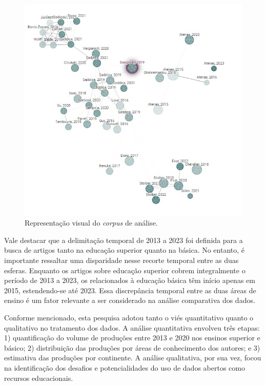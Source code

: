 \documentclass[portuguese]{textolivre}
\begin{document}
\begin{figure}[h]
\centering
\begin{minipage}{0.75\linewidth}
\includegraphics[width=\linewidth]{Fig2.png}
\caption{Representação visual do \textit{corpus} de análise.}
\label{fig2}
\end{minipage}
\end{figure}

Vale destacar que a delimitação temporal de 2013 a 2023 foi definida para a busca de artigos tanto na educação superior quanto na básica. No entanto, é importante ressaltar uma disparidade nesse recorte temporal entre as duas esferas. Enquanto os artigos sobre educação superior cobrem integralmente o período de 2013 a 2023, os relacionados à educação básica têm início apenas em 2015, estendendo-se até 2023. Essa discrepância temporal entre as duas áreas de ensino é um fator relevante a ser considerado na análise comparativa dos dados.

Conforme mencionado, esta pesquisa adotou tanto o viés quantitativo quanto o qualitativo no tratamento dos dados. A análise quantitativa envolveu três etapas: 1) quantificação do volume de produções entre 2013 e 2020 nos ensinos superior e básico; 2) distribuição das produções por áreas de conhecimento dos autores; e 3) estimativa das produções por continente. A análise qualitativa, por sua vez, focou na identificação dos desafios e potencialidades do uso de dados abertos como recursos educacionais.
\end{document}
